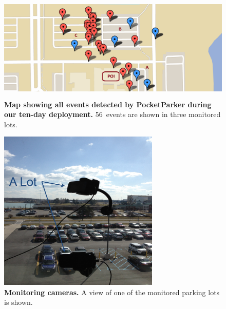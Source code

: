\begin{figure}
\centering
\includegraphics[width=\textwidth,height=2in]{./figures/detectedEventsOnMap.pdf}

\caption{\textbf{Map showing all events detected by PocketParker during our
ten-day deployment.} 56~events are shown in three monitored lots.}

\label{fig-events}
\end{figure}

\begin{figure}
\centering
\includegraphics[width=3.0in]{./figures/Camera_setting.pdf}

\caption{\textbf{Monitoring cameras.} A view of one of the monitored parking
lots is shown.}

\label{fig-camera}
\end{figure}
